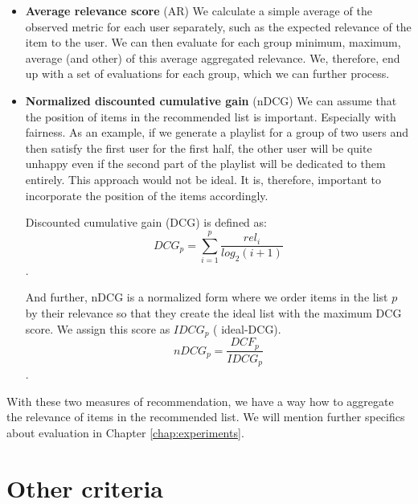 \begin{itemize}
    \item \textbf{Average relevance score} (AR)
        We calculate a simple average of the observed metric for each user separately, such as the expected relevance of the item to the user. We can then evaluate for each group minimum, maximum, average (and other) of this average aggregated relevance. We, therefore, end up with a set of evaluations for each group, which we can further process.
    
    \item \textbf{Normalized discounted cumulative gain} (nDCG)
        We can assume that the position of items in the recommended list is important. Especially with fairness. As an example, if we generate a playlist for a group of two users and then satisfy the first user for the first half, the other user will be quite unhappy even if the second part of the playlist will be dedicated to them entirely. This approach would not be ideal. It is, therefore, important to incorporate the position of the items accordingly.
        
        Discounted cumulative gain (DCG) is defined as:
        \begin{equation}
            DCG_p = \sum_{i=1}^p \dfrac{rel_i}{log_2(i+1)}
        \end{equation}.
        
        And further, nDCG is a normalized form where we order items in the list $p$ by their relevance so that they create the ideal list with the maximum DCG score. We assign this score as $IDCG_p$ ( ideal-DCG).
        \begin{equation}
            nDCG_p = \dfrac{DCF_p}{IDCG_p}
        \end{equation}.
\end{itemize}

With these two measures of recommendation, we have a way how to aggregate the relevance of items in the recommended list. We will mention further specifics about evaluation in Chapter \ref{chap:experiments}.




\section{Other criteria} \label{sec:02_other_criteria}

